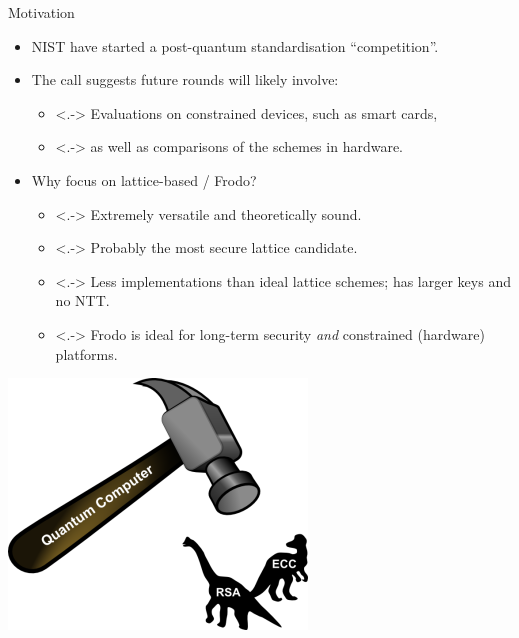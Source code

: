 \documentclass{beamer}            %
\begin{document}
\begin{frame}{Motivation}

\begin{itemize}
\item NIST have started a post-quantum standardisation ``competition''.

\item The call suggests future rounds will likely involve:
\begin{itemize}
\item<.-> Evaluations on constrained devices, such as smart cards,
\item<.-> as well as comparisons of the schemes in hardware.
\end{itemize}
\end{itemize}

\begin{minipage}{0.67\textwidth}
\begin{itemize}

\item Why focus on lattice-based / Frodo?
\begin{itemize}
\item<.-> Extremely versatile and theoretically sound.
\item<.-> Probably the most secure lattice candidate.
\item<.-> Less implementations than ideal lattice schemes; has larger keys and no NTT.
\item<.-> Frodo is ideal for long-term security \emph{and} constrained (hardware) platforms.
\end{itemize}

\end{itemize}

\end{minipage}
\begin{minipage}{0.3\textwidth}
\begin{flushright}
\includegraphics[scale=0.46]{qc-300x252}
\end{flushright}
\end{minipage}  


\end{frame}
\end{document}
